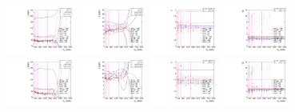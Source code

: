 \begin{figure}[htbp]
  \centering
  \includegraphics[width=0.2\textwidth]{fig/2Dfit/paramSignalShape_allSig_MJJ_HP_bb_HDy_mean.pdf}
  \includegraphics[width=0.2\textwidth]{fig/2Dfit/paramSignalShape_allSig_MJJ_HP_bb_HDy_sigma.pdf}
  \includegraphics[width=0.2\textwidth]{fig/2Dfit/paramSignalShape_allSig_MJJ_HP_bb_HDy_alpha.pdf}
  \includegraphics[width=0.2\textwidth]{fig/2Dfit/paramSignalShape_allSig_MJJ_HP_bb_HDy_alpha2.pdf}\\
  \includegraphics[width=0.2\textwidth]{fig/2Dfit/paramSignalShape_allSig_MJJ_LP_bb_HDy_mean.pdf}
  \includegraphics[width=0.2\textwidth]{fig/2Dfit/paramSignalShape_allSig_MJJ_LP_bb_HDy_sigma.pdf}
  \includegraphics[width=0.2\textwidth]{fig/2Dfit/paramSignalShape_allSig_MJJ_LP_bb_HDy_alpha.pdf}
  \includegraphics[width=0.2\textwidth]{fig/2Dfit/paramSignalShape_allSig_MJJ_LP_bb_HDy_alpha2.pdf}\\

\end{figure}
